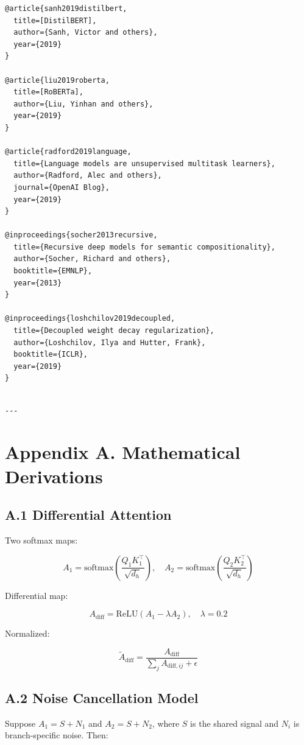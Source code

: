 \begin{lstlisting}
@article{sanh2019distilbert,
  title=[DistilBERT],
  author={Sanh, Victor and others},
  year={2019}
}

@article{liu2019roberta,
  title=[RoBERTa],
  author={Liu, Yinhan and others},
  year={2019}
}

@article{radford2019language,
  title={Language models are unsupervised multitask learners},
  author={Radford, Alec and others},
  journal={OpenAI Blog},
  year={2019}
}

@inproceedings{socher2013recursive,
  title={Recursive deep models for semantic compositionality},
  author={Socher, Richard and others},
  booktitle={EMNLP},
  year={2013}
}

@inproceedings{loshchilov2019decoupled,
  title={Decoupled weight decay regularization},
  author={Loshchilov, Ilya and Hutter, Frank},
  booktitle={ICLR},
  year={2019}
}
\end{lstlisting}
\begin{lstlisting}

---
\end{lstlisting}

\section{Appendix A. Mathematical Derivations}

\subsection{A.1 Differential Attention}

Two softmax maps:

\[
A_1 = \text{softmax}\!\left(\frac{Q_1 K_1^\top}{\sqrt{d_h}}\right), \quad
A_2 = \text{softmax}\!\left(\frac{Q_2 K_2^\top}{\sqrt{d_h}}\right)
\tag{A.1}
\]

Differential map:

\[
A_\text{diff} = \text{ReLU}(A_1 - \lambda A_2), \quad \lambda = 0.2
\tag{A.2}
\]

Normalized:

\[
\tilde{A}_\text{diff} = \frac{A_\text{diff}}{\sum_j A_{\text{diff}, ij} + \epsilon}
\tag{A.3}
\]

\subsection{A.2 Noise Cancellation Model}

Suppose $A_1 = S + N_1$ and $A_2 = S + N_2$, where $S$ is the shared 
signal and $N_i$ is branch-specific noise. Then:

